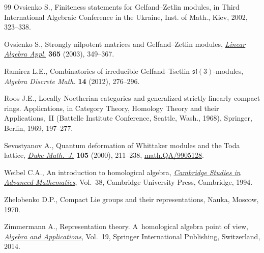 \documentclass[pdftex]{sigma}
\begin{document}
\begin{thebibliography}{99}
Ovsienko S., Finiteness statements for {G}elfand--{Z}etlin modules, in Third
  {I}nternational {A}lgebraic {C}onference in the {U}kraine, Inst. of Math.,
  Kiev, 2002, 323--338.

Ovsienko S., Strongly nilpotent matrices and {G}elfand--{Z}etlin modules,
  \href{http://dx.doi.org/10.1016/S0024-3795(02)00675-4}{\textit{Linear Algebra Appl.}} \textbf{365} (2003), 349--367.

Ramirez L.E., Combinatorics of irreducible {G}elfand--{T}setlin
  {${\mathfrak{sl}}(3)$}-modules, \textit{Algebra Discrete Math.} \textbf{14}
  (2012), 276--296.

Roos J.E., Locally {N}oetherian categories and generalized strictly linearly
  compact rings. {A}pplications, in Category {T}heory, {H}omology {T}heory and
  their {A}pplications,~{II} ({B}attelle {I}nstitute {C}onference, {S}eattle,
  {W}ash., 1968), Springer, Berlin, 1969, 197--277.

Sevostyanov A., Quantum deformation of {W}hittaker modules and the {T}oda
  lattice, \href{http://dx.doi.org/10.1215/S0012-7094-00-10522-4}{\textit{Duke Math.~J.}} \textbf{105} (2000), 211--238,
  \href{http://arxiv.org/abs/math.QA/9905128}{math.QA/9905128}.

Weibel C.A., An introduction to homological algebra, \href{http://dx.doi.org/10.1017/CBO9781139644136}{\textit{Cambridge Studies
  in Advanced Mathematics}}, Vol.~38, Cambridge University Press, Cambridge,
  1994.

Zhelobenko D.P., Compact Lie groups and their representations, Nauka, Moscow,
  1970.

Zimmermann A., Representation theory. A~homological algebra point of view,
  \href{http://dx.doi.org/10.1007/978-3-319-07968-4}{\textit{Algebra and Applications}}, Vol.~19, Springer International
  Publishing, Switzerland, 2014.

\end{thebibliography}\LastPageEnding
\end{document}

